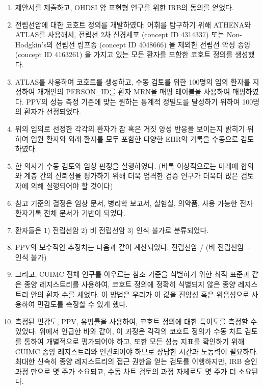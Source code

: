 \documentclass[10.5pt]{book}
\providecommand{\tightlist}{%
  \setlength{\itemsep}{0pt}\setlength{\parskip}{0pt}}
\theoremstyle{definition}
\theoremstyle{definition}
\theoremstyle{definition}
\theoremstyle{remark}
\begin{document}
\begin{enumerate}
\def\labelenumi{\arabic{enumi}.}
\tightlist
\item
  제안서를 제출하고, OHDSI 암 표현형 연구를 위한 IRB의 동의를 얻었다.
\item
  전립선암에 대한 코호트 정의를 개발하였다: 어휘를 탐구하기 위해
  ATHENA와 ATLAS를 사용해서, 전립선 2차 신경세포 (concept ID 4314337)
  또는 Non-Hodgkin's의 전립선 림프종 (concept ID 4048666) 을 제외한
  전립선 악성 종양 (concept ID 4163261) 을 가지고 있는 모든 환자를
  포함한 코호트 정의를 생성했다.
\item
  ATLAS를 사용하여 코호트를 생성하고, 수동 검토를 위한 100명의 임의
  환자를 지정하여 개개인의 PERSON\_ID를 환자 MRN을 매핑 테이블을
  사용하여 매핑하였다. PPV의 성능 측정 기준에 맞는 원하는 통계적
  정밀도를 달성하기 위하여 100명의 환자가 선정되었다.
\item
  위의 임의로 선정한 각각의 환자가 참 혹은 거짓 양성 반응을 보이는지
  밝히기 위하여 입원 환자와 외래 환자를 모두 포함한 다양한 EHR의 기록을
  수동으로 검토하였다.
\item
  한 의사가 수동 검토와 임상 판정을 실행하였다. (비록 이상적으로는
  미래에 합의와 계층 간의 신뢰성을 평가하기 위해 더욱 엄격한 검증 연구가
  더욱더 많은 검토자에 의해 실행되어야 할 것이다)
\item
  참고 기준의 결정은 임상 문서, 병리학 보고서, 실험실, 의약품, 사용
  가능한 전자 환자기록 전체 문서가 기반이 되었다.
\item
  환자들은 1) 전립선암 2) 비 전립선암 3) 인식 불가로 분류되었다.
\item
  PPV의 보수적인 추정치는 다음과 같이 계산되었다: 전립선암 / (비
  전립선암 + 인식 불가)
\item
  그리고, CUIMC 전체 인구를 아우르는 참조 기준을 식별하기 위한 최적
  표준과 같은 종양 레지스트리를 사용하여, 코호트 정의에 정확히 식별되지
  않은 종양 레지스트리 안의 환자 수를 세었다. 이 방법은 우리가 이 값을
  진양성 혹은 위음성으로 사용하여 민감도를 측정할 수 있게 했다.
\item
  측정된 민감도, PPV, 유병률을 사용하여, 코호트 정의에 대한 특이도를
  측정할 수 있었다. 위에서 언급한 바와 같이, 이 과정은 각각의 코호트
  정의가 수동 차트 검토를 통하여 개별적으로 평가되어야 하고, 또한 모든
  성능 지표를 확인하기 위해 CUIMC 종양 레지스트리와 연관되어야 하므로
  상당한 시간과 노동력이 필요하다. 최대한 신속히 종양 레지스트리의 접근
  권한을 얻는 검토를 이행하지만, IRB 승인 과정 만으로 몇 주가 소요되고,
  수동 차트 검토의 과정 자체로도 몇 주가 더 소요된다.
\end{enumerate}
\end{document}
